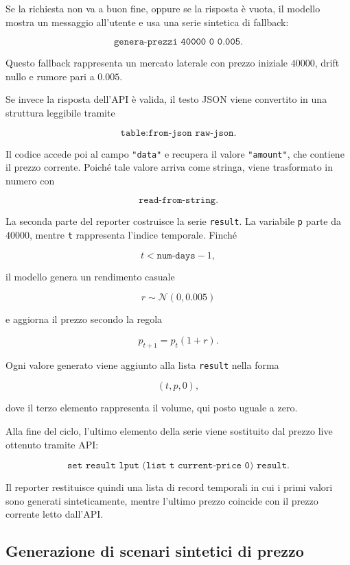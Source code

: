 Se la richiesta non va a buon fine, oppure se la risposta è vuota, il modello
mostra un messaggio all'utente e usa una serie sintetica di fallback:

\[
\texttt{genera-prezzi 40000 0 0.005}.
\]

Questo fallback rappresenta un mercato laterale con prezzo iniziale \(40000\),
drift nullo e rumore pari a \(0.005\).

Se invece la risposta dell'API è valida, il testo JSON viene convertito in una
struttura leggibile tramite

\[
\texttt{table:from-json raw-json}.
\]

Il codice accede poi al campo \texttt{"data"} e recupera il valore
\texttt{"amount"}, che contiene il prezzo corrente. Poiché tale valore arriva
come stringa, viene trasformato in numero con

\[
\texttt{read-from-string}.
\]

La seconda parte del reporter costruisce la serie \texttt{result}. La variabile
\texttt{p} parte da \(40000\), mentre \texttt{t} rappresenta l'indice temporale.
Finché

\[
t < \texttt{num-days} - 1,
\]

il modello genera un rendimento casuale

\[
r \sim \mathcal{N}(0,0.005)
\]

e aggiorna il prezzo secondo la regola

\[
p_{t+1}=p_t(1+r).
\]

Ogni valore generato viene aggiunto alla lista \texttt{result} nella forma

\[
(t,p,0),
\]

dove il terzo elemento rappresenta il volume, qui posto uguale a zero.

Alla fine del ciclo, l'ultimo elemento della serie viene sostituito dal prezzo
live ottenuto tramite API:

\[
\texttt{set result lput (list t current-price 0) result}.
\]

Il reporter restituisce quindi una lista di record temporali in cui i primi
valori sono generati sinteticamente, mentre l'ultimo prezzo coincide con il
prezzo corrente letto dall'API.

\subsection{Generazione di scenari sintetici di prezzo}

